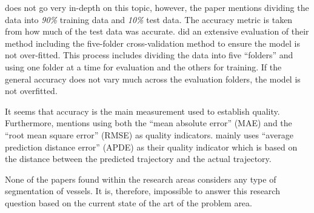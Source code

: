 
\cite{lechtenberg2019} does not go very in-depth on this topic, however, the paper mentions dividing the data into \textit{90\%} training data and \textit{10\%} test data. The accuracy metric is taken from how much of the test data was accurate. \cite{ZHANG2020102729} did an extensive evaluation of their method including the five-folder cross-validation method to ensure the model is not over-fitted. This process includes dividing the data into five “folders” and using one folder at a time for evaluation and the others for training. If the general accuracy does not vary much across the evaluation folders, the model is not overfitted.


It seems that accuracy is the main measurement used to establish quality. Furthermore, \cite{lechtenberg2019} mentions using both the “mean absolute error” (MAE) and the “root mean square error” (RMSE) as quality indicators. \cite{ZHANG2020102729} mainly uses “average prediction distance error” (APDE) as their quality indicator which is based on the distance between the predicted trajectory and the actual trajectory.


None of the papers found within the research areas considers any type of segmentation of vessels. It is, therefore, impossible to answer this research question based on the current state of the art of the problem area.
